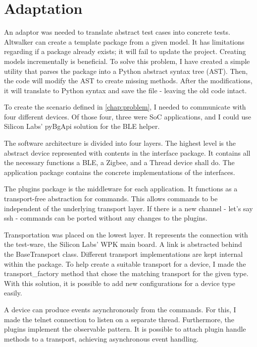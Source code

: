 \section{Adaptation}
\label{sec:meth:ada}

An adaptor was needed to translate abstract test cases into concrete tests. Altwalker can create a template package from a given model. It has limitations regarding if a package already exists; it will fail to update the project. Creating models incrementally is beneficial. To solve this problem, I have created a simple utility that parses the package into a Python abstract syntax tree (AST). Then, the code will modify the AST to create missing methods. After the modifications, it will translate to Python syntax and save the file - leaving the old code intact.

To create the scenario defined in \autoref{chap:problem}, I needed to communicate with four different devices. Of those four, three were SoC applications, and I could use Silicon Labs' pyBgApi solution for the BLE helper.

The software architecture is divided into four layers. The highest level is the abstract device represented with contents in the interface package. It contains all the necessary functions a BLE, a Zigbee, and a Thread device shall do. The application package contains the concrete implementations of the interfaces.

The plugins package is the middleware for each application. It functions as a transport-free abstraction for commands. This allows commands to be independent of the underlying transport layer. If there is a new channel - let's say ssh - commands can be ported without any changes to the plugins.

Transportation was placed on the lowest layer. It represents the connection with the test-ware, the Silicon Labs' WPK main board. A link is abstracted behind the BaseTransport class. Different transport implementations are kept internal within the package. To help create a suitable transport for a device, I made the transport\_factory method that chose the matching transport for the given type. With this solution, it is possible to add new configurations for a device type easily.

A device can produce events asynchronously from the commands. For this, I made the telnet connection to listen on a separate thread. Furthermore, the plugins implement the observable pattern. It is possible to attach plugin handle methods to a transport, achieving asynchronous event handling.

